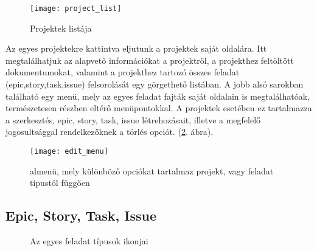 \begin{figure}[H]
	\centering
	\texttt{[image: project\_list]}
	\caption{Projektek listája}
	\label{fig:example-3}
\end{figure}

Az egyes projektekre kattintva eljutunk a projektek saját oldalára. Itt megtalálhatjuk az alapvető információkat a projektről, a projekthez feltöltött dokumentumokat, valamint a projekthez tartozó összes feladat (epic,story,task,issue) felsorolását egy görgethető listában. A jobb alsó sarokban található egy menü, mely az egyes feladat fajták saját oldalain is megtalálhatóak, természetesen részben eltérő menüpontokkal. A projektek esetében ez tartalmazza a szerkesztés, epic, story, task, issue létrehozásait, illetve a megfelelő jogosultsággal rendelkezőknek a törlés opciót. (\ref{fig:example-4}. ábra).

\begin{figure}[H]
	\centering
	\texttt{[image: edit\_menu]}
	\caption{almenü, mely különböző opciókat tartalmaz projekt, vagy feladat típustól függően}
	\label{fig:example-4}
\end{figure}

\subsection{Epic, Story, Task, Issue}
\label{stories}

\begin{figure}[H]
	\centering
	\hspace{35pt}
	\hspace{35pt}
	\hspace{35pt}
	\caption{Az egyes feladat típusok ikonjai}
	\label{fig:example-5}
\end{figure}


